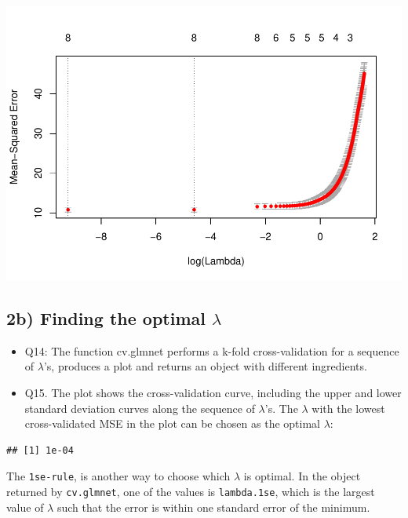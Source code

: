 \documentclass[]{article}
\newenvironment{Shaded}{\begin{snugshade}}{\end{snugshade}}
\newcommand{\OperatorTok}[1]{\textcolor[rgb]{0.81,0.36,0.00}{\textbf{#1}}}
\newcommand{\NormalTok}[1]{#1}
\begin{document}
\includegraphics{Project2_files/figure-latex/unnamed-chunk-4-1.pdf}

\subsection{\texorpdfstring{2b) Finding the optimal
\(\lambda\)}{2b) Finding the optimal \textbackslash{}lambda}}\label{b-finding-the-optimal-lambda}

\begin{itemize}
\item
  Q14: The function cv.glmnet performs a k-fold cross-validation for a
  sequence of \(\lambda\)'s, produces a plot and returns an object with
  different ingredients.
\item
  Q15. The plot shows the cross-validation curve, including the upper
  and lower standard deviation curves along the sequence of
  \(\lambda\)'s. The \(\lambda\) with the lowest cross-validated MSE in
  the plot can be chosen as the optimal \(\lambda\):
\end{itemize}

\begin{Shaded}
\end{Shaded}

\begin{verbatim}
## [1] 1e-04
\end{verbatim}

The \texttt{1se-rule}, is another way to choose which \(\lambda\) is
optimal. In the object returned by \texttt{cv.glmnet}, one of the values
is \texttt{lambda.1se}, which is the largest value of \(\lambda\) such
that the error is within one standard error of the minimum.
\end{document}
